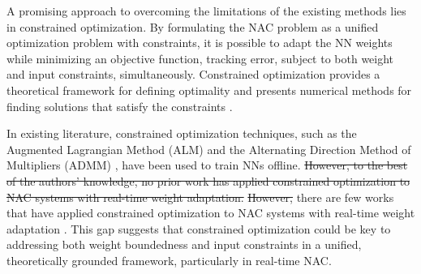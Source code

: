 \documentclass[letterpaper, journal]{IEEEtran}
\providecommand{\DIFadd}[1]{{\protect\color{blue}\uwave{#1}}} %
\providecommand{\DIFdel}[1]{{\protect\color{red}\sout{#1}}} %
\providecommand{\DIFaddbegin}{} %
\providecommand{\DIFaddend}{} %
\providecommand{\DIFdelbegin}{} %
\providecommand{\DIFdelend}{} %
\begin{document}

A promising approach to overcoming the limitations of the existing methods lies in constrained optimization.
By formulating the NAC problem as a unified optimization problem with constraints, it is possible to adapt the NN weights while minimizing an objective function, \eg tracking error, subject to both weight and input constraints, simultaneously.
Constrained optimization provides a theoretical framework for defining optimality and presents numerical methods for finding solutions that satisfy the constraints \cite{Nocedal:2006aa}.

In existing literature, constrained optimization techniques, such as the Augmented Lagrangian Method (ALM) \cite{Evens:2021aa} and the Alternating Direction Method of Multipliers (ADMM) \cite{Wang:2019aa,Taylor:2016aa}, have been used to train NNs offline. 
\DIFdelbegin %
\DIFdel{However, to the best of the authors' knowledge, no prior work has applied constrained optimization to NAC systems with real-time weight adaptation. 
    }%
\DIFdel{However, }\DIFdelend %
\DIFaddbegin \DIFadd{However, }\DIFaddend there are few works that have applied constrained optimization to NAC systems with real-time weight adaptation \cite{Ryu:2024aa,Ryu:2025aa}.
\DIFdelbegin %
\DIFdelend %
This gap suggests that constrained optimization could be key to addressing both weight boundedness and input constraints in a unified, theoretically grounded framework, particularly in real-time NAC.
\end{document}

